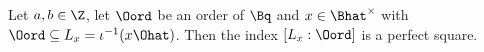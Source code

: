 Let $a,b\in\Z$, let $\Oord$ be an order of $\Bq$ and $x\in\Bhat^\times$ with $\Oord\subseteq L_x=\iota^{-1}(x\Ohat)$. Then the index
$[L_x:\Oord]$ is a perfect square.

